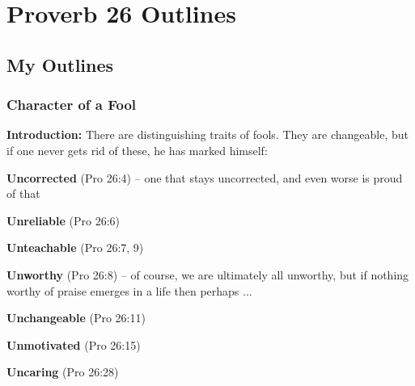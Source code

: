 \section{Proverb 26 Outlines}

\subsection{My Outlines}

\subsubsection{Character of a Fool}
\textbf{Introduction: } There are distinguishing traits of fools. They are changeable, but if one never gets rid of these, he has marked himself:
\begin{compactenum}[I.]
    \item \textbf{Uncorrected} (Pro 26:4) -- one that stays uncorrected, and even worse is proud of that
    \item \textbf{Unreliable} (Pro 26:6)
    \item \textbf{Unteachable} (Pro 26:7, 9)
    \item \textbf{Unworthy} (Pro 26:8) -- of course, we are ultimately all unworthy, but if nothing worthy of praise emerges in a life then perhaps ...
    \item \textbf{Unchangeable} (Pro 26:11)
    \item \textbf{Unmotivated} (Pro 26:15)
    \item \textbf{Uncaring} (Pro 26:28)
\end{compactenum}


